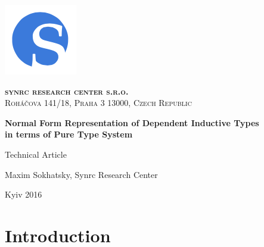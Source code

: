 \documentclass[11pt,oneside]{article}
\begin{document}
\thispagestyle{empty}
\begin{center}

\begin{minipage}[t]{2cm}
    \includegraphics[scale=0.4]{img/S}
\end{minipage}
\begin{minipage}[t]{12cm}
    \begin{flushright}
        \textsc{{\Large {\bf {\color{Blue}syn}{\color{OrangeRed}rc} research center s.r.o.}}}\\
        \textsc{Roháčova 141/18, Praha 3 13000, Czech Republic}\\
    \end{flushright}
\end{minipage}

\vspace{3cm}

    \vspace{3cm}   {\Large \bf Normal Form Representation of Dependent Inductive Types\\ \vspace{0.2cm}
                                in terms of Pure Type System\\}\par
    \vspace{0.3cm} {\Large Technical Article\par}
    \vspace{0.3cm} {\Large Maxim Sokhatsky, Synrc Research Center\par}
    \vspace{4cm}   {\Large Kyiv 2016}

\end{center}

\newpage
\vspace{2cm}
\tableofcontents
\newpage
\section{Introduction}

\vspace{1cm}

\end{document}
